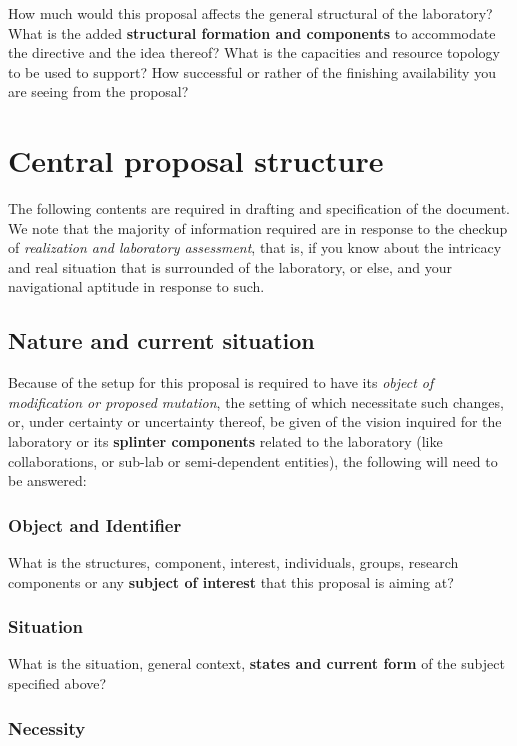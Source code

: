 \documentclass[10pt,a4paper]{article}
\begin{document}
How much would this proposal affects the general structural of the laboratory? What is the added \textbf{structural formation and components} to accommodate the directive and the idea thereof? What is the capacities and resource topology to be used to support? How successful or rather of the finishing availability you are seeing from the proposal? 

\section{Central proposal structure}

The following contents are required in drafting and specification of the document. We note that the majority of information required are in response to the checkup of \textit{realization and laboratory assessment}, that is, if you know about the intricacy and real situation that is surrounded of the laboratory, or else, and your navigational aptitude in response to such. 

\subsection{Nature and current situation}

Because of the setup for this proposal is required to have its \textit{object of modification or proposed mutation}, the setting of which necessitate such changes, or, under certainty or uncertainty thereof, be given of the vision inquired for the laboratory or its \textbf{splinter components} related to the laboratory (like collaborations, or sub-lab or semi-dependent entities), the following will need to be answered: 

\subsubsection{Object and Identifier}

What is the structures, component, interest, individuals, groups, research components or any \textbf{subject of interest} that this proposal is aiming at? 

\subsubsection{Situation}

What is the situation, general context, \textbf{states and current form} of the subject specified above? 

\subsubsection{Necessity}
\end{document}
